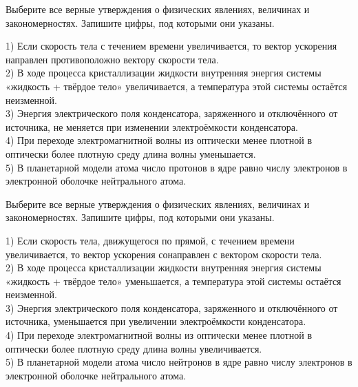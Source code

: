 \begin{taskbasic}[code={\label{task:kim18_v07}}]
Выберите все верные утверждения о физических явлениях, величинах и закономерностях. Запишите цифры, под которыми они указаны.

1) Если скорость тела с течением времени увеличивается, то вектор ускорения направлен противоположно вектору скорости тела.\\
2) В ходе процесса кристаллизации жидкости внутренняя энергия системы «жидкость + твёрдое тело» увеличивается, а температура этой системы остаётся неизменной.\\
3) Энергия электрического поля конденсатора, заряженного и отключённого от источника, не меняется при изменении электроёмкости конденсатора.\\
4) При переходе электромагнитной волны из оптически менее плотной в оптически более плотную среду длина волны уменьшается.\\
5) В планетарной модели атома число протонов в ядре равно числу электронов в электронной оболочке нейтрального атома.

\end{taskbasic}

\begin{taskbasic}[code={\label{task:kim18_v08}}]
Выберите все верные утверждения о физических явлениях, величинах и закономерностях. Запишите цифры, под которыми они указаны.

1) Если скорость тела, движущегося по прямой, с течением времени увеличивается, то вектор ускорения сонаправлен с вектором скорости тела.\\
2) В ходе процесса кристаллизации жидкости внутренняя энергия системы «жидкость + твёрдое тело» уменьшается, а температура этой системы остаётся неизменной.\\
3) Энергия электрического поля конденсатора, заряженного и отключённого от источника, уменьшается при увеличении электроёмкости конденсатора.\\
4) При переходе электромагнитной волны из оптически менее плотной в оптически более плотную среду длина волны увеличивается.\\
5) В планетарной модели атома число нейтронов в ядре равно числу электронов в электронной оболочке нейтрального атома.

\end{taskbasic}

